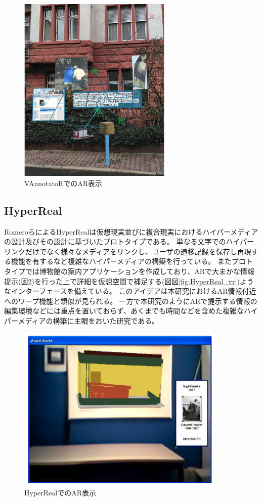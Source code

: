 \begin{figure}[h]
  \centering 
  \includegraphics[height=90mm]{images/VAnnotatoR.png}
  \caption{VAnnotatoRでのAR表示} \label{fig:VAnnotatoR}
\end{figure}

\subsection{HyperReal}
RomeroらによるHyperRealは\cite{10.1145/900051.900055}仮想現実並びに複合現実におけるハイパーメディアの設計及びその設計に基づいたプロトタイプである。
単なる文字でのハイパーリンクだけでなく様々なメディアをリンクし、ユーザの遷移記録を保存し再現する機能を有するなど複雑なハイパーメディアの構築を行っている。
またプロトタイプでは博物館の案内アプリケーションを作成しており、ARで大まかな情報提示(図\ref{fig:HyperReal_ar})を行った上で詳細を仮想空間で補足する(図図\ref{fig:HyperReal_vr})ようなインターフェースを備えている。
このアイデアは本研究におけるAR情報付近へのワープ機能と類似が見られる。
一方で本研究のようにARで提示する情報の編集環境などには重点を置いておらず、あくまでも時間などを含めた複雑なハイパーメディアの構築に主眼をおいた研究である。
\begin{figure}[h]
  \centering 
  \includegraphics[height=80mm]{images/HyperReal_ar.png}
  \caption{HyperRealでのAR表示} \label{fig:HyperReal_ar}
\end{figure}

